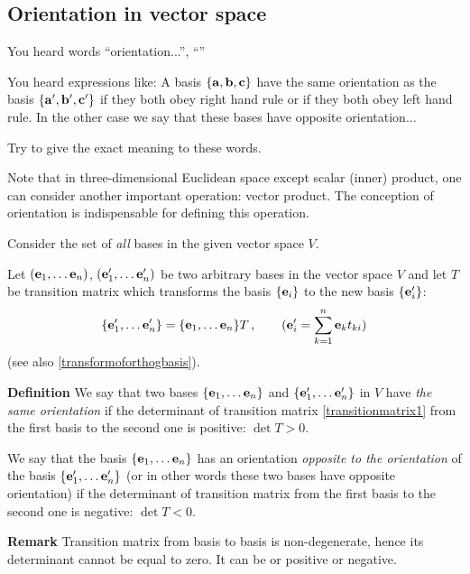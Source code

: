 \documentclass[12pt]{article}
\numberwithin{equation}{section}
\begin{document}

   \bigskip




\m


\subsection {Orientation in vector space}

    You heard  words ``orientation...'', ``''

    You heard expressions like: A basis  $\{{\bf a},{\bf b},{\bf c}\}$ have the same orientation as the basis $\{{\bf a}',{\bf b}',{\bf c}'\}$
     if they both obey right hand rule or if they both obey left hand rule.
     In the other case we say that these bases have opposite orientation...


    Try to give the exact meaning to these words.

   Note that in  three-dimensional Euclidean space except scalar (inner) product, one can consider
   another important operation: vector product.  The conception of 
orientation is indispensable for
   defining this operation.


   \bigskip
Consider the set of {\it all} bases in the  given vector space  $V$.


 Let  $({\bf e}_1,\dots{\bf e}_n)$, $({\bf e}'_1,\dots{\bf e}'_n)$ be two arbitrary bases in the vector space $V$
 and let $T$ be transition matrix
  which transforms the basis $\{{\bf e}_i\}$ to the new  basis $\{{\bf e}'_i\}$:
\begin{equation}\label{transitionmatrix1}
    \{{\bf e}'_1,\dots{\bf e}'_n\}=\{{\bf e}_1,\dots{\bf e}_n\}T\,,\qquad ({\bf e}'_i=\sum_{k=1}^n{\bf e}_k t_{ki})
\end{equation}
(see also \eqref{transformoforthogbasis}).




  {\bf Definition}
   We say that two bases
 $\{{\bf e}_1,\dots{\bf e}_n\}$ and $\{{\bf e}'_1,\dots{\bf e}'_n\}$ in $V$
   have {\it the same orientation}
  if  the determinant of transition matrix \eqref{transitionmatrix1} from the first basis to the second one is positive:
  $\det T>0$.

\smallskip

  \noindent We say that the basis $\{{\bf e}_1,\dots{\bf e}_n\}$ has an orientation
  {\it opposite to the orientation} of the basis $\{{\bf e}'_1,\dots{\bf e}'_n\}$
  (or in other words these two bases have opposite orientation)
  if the determinant of transition matrix from the first basis to the second one is negative: $\det T<0$.

{\bf Remark} Transition matrix from basis to basis is non-degenerate, hence its determinant cannot be equal to zero.
 It can be or positive or negative.

\m
\end{document}
